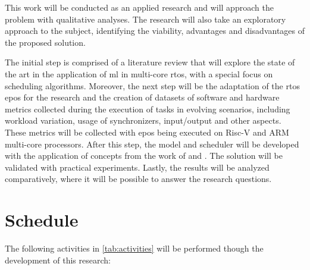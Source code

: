 \documentclass[journal,onecolumn]{IEEEtran}
\begin{document}
This work will be conducted as an applied research and will approach the problem with qualitative analyses. The research will also take an exploratory approach to the subject, identifying the viability, advantages and disadvantages of the proposed solution.

The initial step is comprised of a literature review that will explore the state of the art in the application of \gls{ml} in multi-core \gls{rtos}, with a special focus on scheduling algorithms. Moreover, the next step will be the adaptation of the \gls{rtos} \gls{epos} for the research and the creation of datasets of software and hardware metrics collected during the execution of tasks in evolving scenarios, including workload variation, usage of synchronizers, input/output and other aspects. These metrics will be collected with \gls{epos} being executed on Risc-V and ARM multi-core processors. After this step, the model and scheduler will be developed with the application of concepts from the work of \citet{horstmann2019framework} and \citet{hoffmann2021online}. The solution will be validated with practical experiments. Lastly, the results will be analyzed comparatively, where it will be possible to answer the research questions.

\section{Schedule}

The following activities in \autoref{tab:activities} will be performed though the development of this research:

\clearpage
\end{document}
